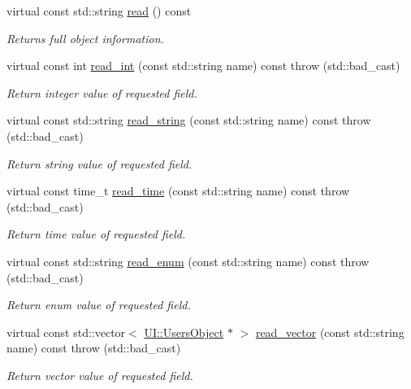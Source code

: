 \begin{DoxyCompactItemize}
virtual const std::string \hyperlink{classCore_1_1AbstractGroup_a0306b58e715d164aef3e29de0ec659bd}{read} () const 
\begin{DoxyCompactList}\small\item\em Returns full object information. \item\end{DoxyCompactList}\item 
virtual const int \hyperlink{classCore_1_1AbstractGroup_a7e15ec9b621230659a5ca2f0be724d83}{read\_\-int} (const std::string name) const   throw (std::bad\_\-cast)
\begin{DoxyCompactList}\small\item\em Return integer value of requested field. \item\end{DoxyCompactList}\item 
virtual const std::string \hyperlink{classCore_1_1AbstractGroup_a907fc505a7f7828fcd2e7f6eaf5e27cd}{read\_\-string} (const std::string name) const   throw (std::bad\_\-cast)
\begin{DoxyCompactList}\small\item\em Return string value of requested field. \item\end{DoxyCompactList}\item 
virtual const time\_\-t \hyperlink{classCore_1_1AbstractGroup_af52530d29e3b8f0047a0c0675dc6c912}{read\_\-time} (const std::string name) const   throw (std::bad\_\-cast)
\begin{DoxyCompactList}\small\item\em Return time value of requested field. \item\end{DoxyCompactList}\item 
virtual const std::string \hyperlink{classCore_1_1AbstractGroup_a2f373e90feaad172563c6256ae30a6a6}{read\_\-enum} (const std::string name) const   throw (std::bad\_\-cast)
\begin{DoxyCompactList}\small\item\em Return enum value of requested field. \item\end{DoxyCompactList}\item 
virtual const std::vector$<$ \hyperlink{classUI_1_1UsersObject}{UI::UsersObject} $\ast$ $>$ \hyperlink{classCore_1_1AbstractGroup_ab582f4364426a152875742278ba0d999}{read\_\-vector} (const std::string name) const   throw (std::bad\_\-cast)
\begin{DoxyCompactList}\small\item\em Return vector value of requested field. \item\end{DoxyCompactList}\item 

\end{DoxyCompactItemize}
